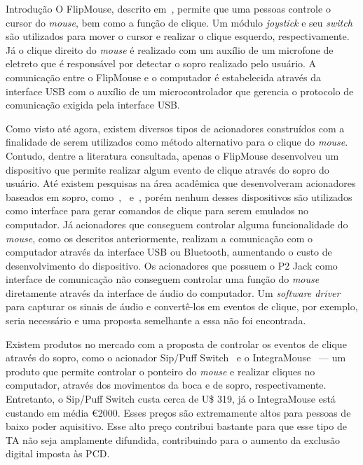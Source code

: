\begin{chapter}{Introdução}
O FlipMouse, descrito em~\cite{Aigner16}, permite que uma pessoas controle o
cursor do \textit{mouse}, bem como a função de clique. Um módulo
\textit{joystick} e seu \textit{switch} são utilizados para mover o cursor e 
realizar o clique esquerdo, respectivamente. Já o clique direito do
\textit{mouse} é realizado com um auxílio de um microfone de eletreto que é
responsável por detectar o sopro realizado pelo usuário. A comunicação entre o
FlipMouse e o computador é estabelecida através da interface USB com o auxílio
de um microcontrolador que gerencia o protocolo de comunicação exigida pela
interface USB.

Como visto até agora, existem diversos tipos de acionadores construídos com a
finalidade de serem utilizados como método alternativo para o clique do
\textit{mouse}.  Contudo, dentre a literatura consultada, apenas o FlipMouse
desenvolveu um dispositivo que permite realizar algum evento de clique através
do sopro do usuário. Até existem pesquisas na área acadêmica que desenvolveram
acionadores baseados em sopro, como~\cite{Thaller13},~\cite{Mougharbel13}
e~\cite{Filho14}, porém nenhum desses dispositivos são utilizados como interface
para gerar comandos de clique para serem emulados no computador. Já acionadores
que conseguem controlar alguma funcionalidade do \textit{mouse}, 
como os descritos anteriormente,  realizam a comunicação com o computador 
através da interface USB ou Bluetooth, aumentando o custo de desenvolvimento do
dispositivo. Os acionadores que possuem o P2 Jack como interface de comunicação 
não conseguem controlar uma função do \textit{mouse} diretamente através da
interface de áudio do computador. Um \textit{software driver} para capturar os
sinais de áudio e convertê-los em eventos de clique, por exemplo, seria
necessário e uma proposta semelhante a essa não foi encontrada.    

Existem produtos no mercado com a proposta de controlar os eventos de
clique através do sopro, como o acionador Sip/Puff Switch~\cite{SipPuff} e o
IntegraMouse~\cite{IntegraMouse} --- um produto que permite controlar o ponteiro do
\textit{mouse} e realizar cliques no computador, através dos movimentos da boca
e de sopro, respectivamente. Entretanto, o Sip/Puff Switch custa cerca
de U\$ 319, já o IntegraMouse está custando em média \euro 2000. Esses preços
são extremamente altos para pessoas de baixo poder aquisitivo. Esse alto preço
contribui bastante para que esse tipo de TA não seja
amplamente difundida, contribuindo para o aumento da exclusão digital imposta às
PCD.


\end{chapter}
